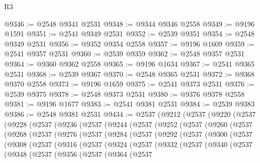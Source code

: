 \begin{lexlean}{R3}
\begin{coremodule}
@9346 := @2548 @9341 @2531
@9348 := @9344 @9346 @2558
@9349 := @9196 @1591
@9351 := @2541 @9349 @2531
@9352 := @2539 @9351
@9354 := @2548 @9349 @2531
@9356 := @9352 @9354 @2558
@9357 := @9196 @1609
@9359 := @2541 @9357 @2531
@9360 := @2539 @9359
@9362 := @2548 @9357 @2531
@9364 := @9360 @9362 @2558
@9365 := @9196 @1634
@9367 := @2541 @9365 @2531
@9368 := @2539 @9367
@9370 := @2548 @9365 @2531
@9372 := @9368 @9370 @2558
@9373 := @9196 @1659
@9375 := @2541 @9373 @2531
@9376 := @2539 @9375
@9378 := @2548 @9373 @2531
@9380 := @9376 @9378 @2558
@9381 := @9196 @1677
@9383 := @2541 @9381 @2531
@9384 := @2539 @9383
@9386 := @2548 @9381 @2531
@9434 := @2537
    (@9212
      (@2537
        (@9220
          (@2537
            (@9228
              (@2537
                (@9236
                  (@2537
                    (@9244
                      (@2537
                        (@9252
                          (@2537
                            (@9260
                              (@2537
                                (@9268
                                  (@2537
                                    (@9276
                                      (@2537
                                        (@9284
                                          (@2537
                                            (@9292
                                              (@2537
                                                (@9300
                                                  (@2537
                                                    (@9308
                                                      (@2537
                                                        (@9316
                                                          (@2537
                                                            (@9324
                                                              (@2537
                                                                (@9332
                                                                  (@2537
                                                                    (@9340
                                                                      (@2537
                                                                        (@9348
                                                                          (@2537
                                                                            (@9356
                                                                              (@2537
                                                                                (@9364
                                                                                  (@2537

\end{coremodule}
\end{lexlean}
